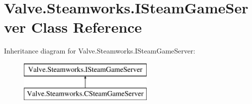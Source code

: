 \hypertarget{classValve_1_1Steamworks_1_1ISteamGameServer}{}\section{Valve.\+Steamworks.\+I\+Steam\+Game\+Server Class Reference}
\label{classValve_1_1Steamworks_1_1ISteamGameServer}
Inheritance diagram for Valve.\+Steamworks.\+I\+Steam\+Game\+Server\+:\begin{figure}[H]
\begin{center}
\leavevmode
\includegraphics[height=2.000000cm]{classValve_1_1Steamworks_1_1ISteamGameServer}
\end{center}
\end{figure}
